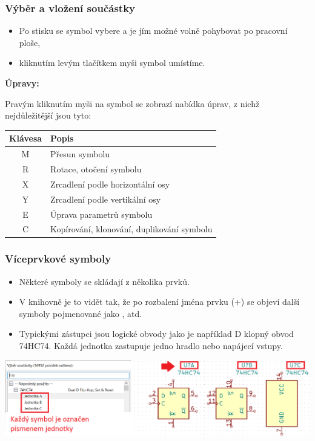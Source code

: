 \documentclass{beamer}
\begin{document}
\begin{frame}
	\frametitle{Výběr a vložení součástky}
	
	\begin{itemize}
		\item Po stisku  se symbol vybere a je jím možné volně pohybovat po pracovní ploše,
		\item kliknutím levým tlačítkem myši symbol umístíme.
	\end{itemize}
	
	\textbf{Úpravy:}
	
	Pravým kliknutím myši na symbol se  zobrazí nabídka úprav, z nichž nejdůležitější jsou tyto:
	
	\begin{center}
		\begin{tabular}{| c | l |}
			\hline
			\textbf{Klávesa} & \textbf{Popis} \\ \hline
			M & Přesun symbolu \\ \hline
			R & Rotace, otočení symbolu \\ \hline
			X & Zrcadlení podle horizontální osy \\ \hline
			Y & Zrcadlení podle vertikální osy \\ \hline
			E & Úprava parametrů symbolu \\ \hline
			C & Kopírování, klonování, duplikování symbolu \\ \hline
		\end{tabular}
	\end{center}
	
\end{frame}
\begin{frame}
	\frametitle{Víceprvkové symboly}
	\small
	\begin{itemize}
		\item Některé symboly se skládají z několika prvků.
		\item V knihovně je to vidět tak, že po rozbalení jména prvku (+) se objeví další symboly pojmenované jako ,  atd.
		\item Typickými zástupci jsou logické obvody jako je například D klopný obvod 74HC74. Každá jednotka zastupuje jedno hradlo nebo napájecí vstupy.
	\end{itemize}
	
	\begin{center}
		\includegraphics[width=\textwidth]{obr/umisti_soucastku03.png}
	\end{center}
	
\end{frame}
\end{document}

